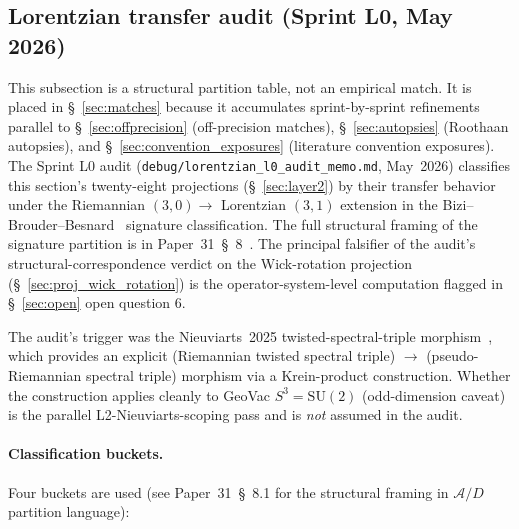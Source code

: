 \documentclass[11pt]{article}
\begin{document}
\subsection{Lorentzian transfer audit (Sprint L0, May 2026)}
\label{sec:lorentzian_transfer_audit}

This subsection is a structural partition table, not an empirical
match.  It is placed in \S~\ref{sec:matches} because it accumulates
sprint-by-sprint refinements parallel to \S~\ref{sec:offprecision}
(off-precision matches), \S~\ref{sec:autopsies} (Roothaan autopsies),
and \S~\ref{sec:convention_exposures} (literature convention
exposures).  The Sprint L0 audit
(\texttt{debug/lorentzian\_l0\_audit\_memo.md}, May~2026) classifies
this section's twenty-eight projections (\S~\ref{sec:layer2}) by their
transfer behavior under the Riemannian $(3, 0) \to$ Lorentzian $(3, 1)$
extension in the Bizi--Brouder--Besnard~\cite{bizi_brouder_besnard2018}
signature classification.  The full structural framing of the
signature partition is in Paper~31~\S~8~\cite{paper31}.  The principal
falsifier of the audit's structural-correspondence verdict on the
Wick-rotation projection (\S~\ref{sec:proj_wick_rotation}) is the
operator-system-level computation flagged in \S~\ref{sec:open} open
question 6.

The audit's trigger was the Nieuviarts~2025
twisted-spectral-triple morphism~\cite{nieuviarts2025a}, which provides
an explicit (Riemannian twisted spectral triple) $\to$
(pseudo-Riemannian spectral triple) morphism via a Krein-product
construction.  Whether the construction applies cleanly to
GeoVac $S^3 = \mathrm{SU}(2)$ (odd-dimension caveat) is the parallel
L2-Nieuviarts-scoping pass and is \emph{not} assumed in the audit.

\paragraph{Classification buckets.}
Four buckets are used (see Paper~31~\S~8.1 for the structural framing
in $\mathcal{A}/D$ partition language):
\end{document}
